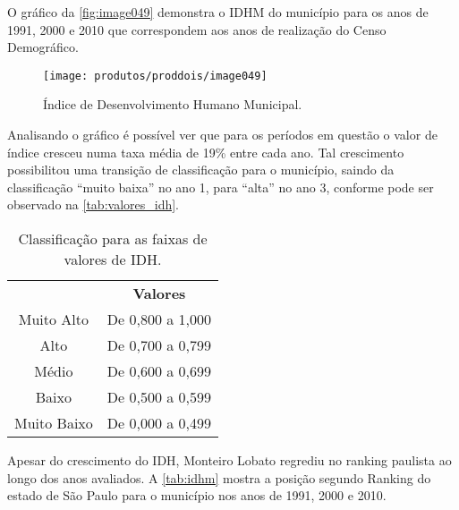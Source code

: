 O gráfico da \autoref{fig:image049} demonstra o IDHM do município para os anos de 1991, 2000 e 2010 que correspondem aos anos de realização do Censo Demográfico.
 
  \begin{figure}[h!]
 	\centering
 	\texttt{[image: produtos/proddois/image049]}
 	\caption{Índice de Desenvolvimento Humano Municipal.}
 	\label{fig:image049}
 \end{figure}


Analisando o gráfico é possível ver que para os períodos em questão o valor de índice cresceu numa taxa média de 19\% entre cada ano. Tal crescimento possibilitou uma transição de classificação para o município, saindo da classificação “muito baixa” no ano 1, para “alta” no ano 3, conforme pode ser observado na  \autoref{tab:valores_idh}.

\begin{center}
	\begin{table}[htbp]
	\centering
	\caption{Classificação para as faixas de valores de IDH.}
	\begin{tabular}{c|c}
		\rowcolor[rgb]{ .969,  .588,  .275} \multicolumn{1}{c}{\textcolor[rgb]{ 1,  1,  1}{\textbf{Faixas}}} & \textcolor[rgb]{ 1,  1,  1}{\textbf{Valores}} \\
		\rowcolor[rgb]{ .992,  .914,  .851} Muito Alto & De 0,800 a 1,000 \\
		\rowcolor[rgb]{ .984,  .831,  .706} Alto  & De 0,700 a 0,799 \\
		\rowcolor[rgb]{ .992,  .914,  .851} Médio & De 0,600 a 0,699 \\
		\rowcolor[rgb]{ .984,  .831,  .706} Baixo & De 0,500 a 0,599 \\
		\rowcolor[rgb]{ .992,  .914,  .851} Muito Baixo & De 0,000 a 0,499 \\
	\end{tabular}%
	\label{tab:valores_idh}%
\end{table}%
\end{center}

Apesar do crescimento do IDH, Monteiro Lobato regrediu no ranking paulista ao longo dos anos avaliados. A \autoref{tab:idhm} mostra a posição segundo Ranking do estado de São Paulo para o município nos anos de 1991, 2000 e 2010.
 
